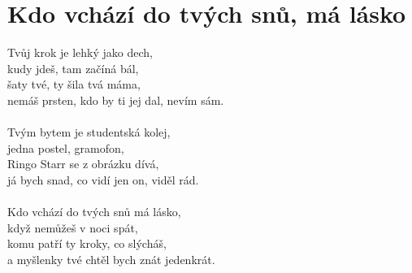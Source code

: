 \section{Kdo vchází do tvých snů, má lásko}
Tvůj krok je lehký jako dech,\\
kudy jdeš, tam začíná bál,\\
šaty tvé, ty šila tvá máma,\\
nemáš prsten, kdo by ti jej dal, nevím sám.\\
\\
Tvým bytem je studentská kolej,\\
jedna postel, gramofon,\\
Ringo Starr se z obrázku dívá,\\
já bych snad, co vidí jen on, viděl rád.\\
\\
Kdo vchází do tvých snů má lásko,\\
když nemůžeš v noci spát,\\
komu patří ty kroky, co slýcháš,\\
a myšlenky tvé chtěl bych znát jedenkrát.
